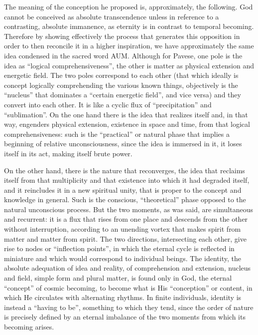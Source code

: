 The meaning of the conception he proposed is, approximately, the following. God cannot be conceived as absolute transcendence unless in reference to a contrasting, absolute immanence, as eternity is in contrast to temporal becoming. Therefore by showing effectively the process that generates this opposition in order to then reconcile it in a higher inspiration, we have approximately the same idea condensed in the sacred word AUM. Although for Pavese, one pole is the idea as ``logical comprehensiveness'', the other is matter as physical extension and energetic field. The two poles correspond to each other (that which ideally is concept logically comprehending the various known things, objectively is the ``nucleus'' that dominates a ``certain energetic field'', and vice versa) and they convert into each other. It is like a cyclic flux of ``precipitation'' and ``sublimation''. On the one hand there is the idea that realizes itself and, in that way, engenders physical extension, existence in space and time, from that logical comprehensiveness: such is the ``practical'' or natural phase that implies a beginning of relative unconsciousness, since the idea is immersed in it, it loses itself in its act, making itself brute power.

On the other hand, there is the nature that reconverges, the idea that reclaims itself from that multiplicity and that existence into which it had degraded itself, and it reincludes it in a new spiritual unity, that is proper to the concept and knowledge in general. Such is the conscious, ``theoretical'' phase opposed to the natural unconscious process. But the two moments, as was said, are simultaneous and recurrent: it is a flux that rises from one place and descends from the other without interruption, according to an unending vortex that makes spirit from matter and matter from spirit. The two directions, intersecting each other, give rise to nodes or ``inflection points'', in which the eternal cycle is reflected in miniature and which would correspond to individual beings. The identity, the absolute adequation of idea and reality, of comprehension and extension, nucleus and field, simple form and plural matter, is found only in God, the eternal ``concept'' of cosmic becoming, to become what is His ``conception'' or content, in which He circulates with alternating rhythms. In finite individuals, identity is instead a ``having to be'', something to which they tend, since the order of nature is precisely defined by an eternal imbalance of the two moments from which its becoming arises.

